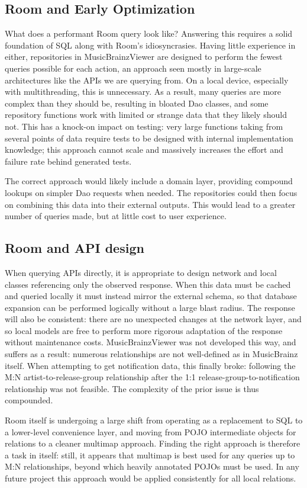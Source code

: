 \documentclass[]{article}
\begin{document}
\subsection{Room and Early Optimization}
What does a performant Room query look like? Answering this requires a solid foundation of SQL along with Room's idiosyncrasies. Having little experience in either, repositories in MusicBrainzViewer are designed to perform the fewest queries possible for each action, an approach seen mostly in large-scale architectures like the APIs we are querying from. On a local device, especially with multithreading, this is unnecessary. As a result, many queries are more complex than they should be, resulting in bloated Dao classes, and some repository functions work with limited or strange data that they likely should not. This has a knock-on impact on testing: very large functions taking from several points of data require tests to be designed with internal implementation knowledge; this approach cannot scale and massively increases the effort and failure rate behind generated tests.

The correct approach would likely include a domain layer, providing compound lookups on simpler Dao requests when needed. The repositories could then focus on combining this data into their external outputs. This would lead to a greater number of queries made, but at little cost to user experience.

\subsection{Room and API design}
When querying APIs directly, it is appropriate to design network and local classes referencing only the observed response. When this data must be cached and queried locally it must instead mirror the external schema, so that database expansion can be performed logically without a large blast radius. The response will also be consistent: there are no unexpected changes at the network layer, and so local models are free to perform more rigorous adaptation of the response without maintenance costs. MusicBrainzViewer was not developed this way, and suffers as a result: numerous relationships are not well-defined as in MusicBrainz itself. When attempting to get notification data, this finally broke: following the M:N artist-to-release-group relationship after the 1:1 release-group-to-notification relationship was not feasible. The complexity of the prior issue is thus compounded.

Room itself is undergoing a large shift from operating as a replacement to SQL to a lower-level convenience layer, and moving from POJO intermediate objects for relations to a cleaner multimap approach. Finding the right approach is therefore a task in itself: still, it appears that multimap is best used for any queries up to M:N relationships, beyond which heavily annotated POJOs must be used. In any future project this approach would be applied consistently for all local relations.
\end{document}
